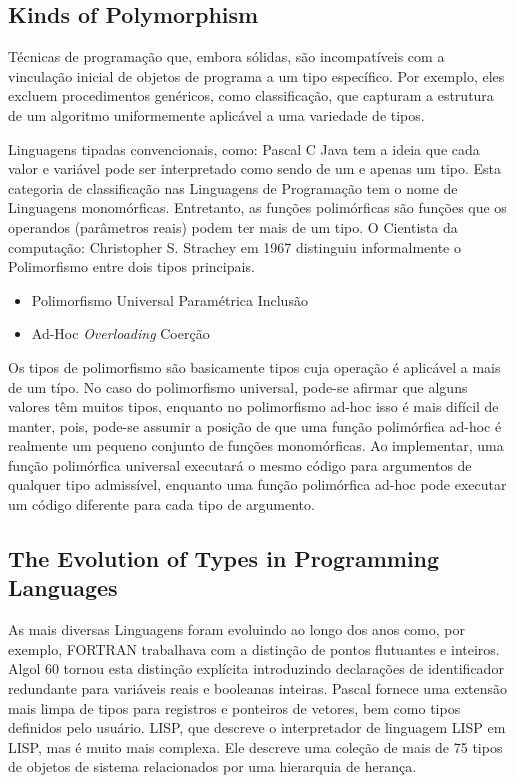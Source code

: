 \subsection{Kinds of Polymorphism}
Técnicas de programação que, embora sólidas, são incompatíveis com a vinculação inicial de objetos de programa a um tipo específico.
Por exemplo, eles excluem procedimentos genéricos, como classificação, que capturam a estrutura de um algoritmo uniformemente aplicável a uma variedade de tipos.
\par Linguagens tipadas convencionais, como: Pascal C Java tem a ideia que cada valor e variável pode ser interpretado como sendo de um e apenas um tipo.
Esta categoria de classificação nas Linguagens de Programação tem o nome de Linguagens monomórficas.
Entretanto, as funções polimórficas são funções que os operandos (parâmetros reais) podem ter mais de um tipo. O Cientista da computação: Christopher S. Strachey em 1967 distinguiu informalmente o Polimorfismo entre dois tipos principais.
\begin{itemize}
    \item Polimorfismo Universal
    \subitem Paramétrica
    \subitem Inclusão
    \item Ad-Hoc
    \subitem \textit{Overloading}
    \subitem Coerção 
\end{itemize}
\par Os tipos de polimorfismo são basicamente tipos cuja operação é aplicável a mais de um típo.
No caso do polimorfismo universal, pode-se afirmar que alguns valores têm muitos tipos, enquanto no polimorfismo ad-hoc isso é mais difícil de manter, pois, pode-se assumir a posição de que uma função polimórfica ad-hoc é realmente um pequeno conjunto de funções monomórficas.
Ao implementar, uma função polimórfica universal executará o mesmo código para argumentos de qualquer tipo admissível, enquanto uma função polimórfica ad-hoc pode executar um código diferente para cada tipo de argumento.
\subsection{The Evolution of Types in Programming Languages}
As mais diversas Linguagens foram evoluindo ao longo dos anos como, por exemplo, FORTRAN trabalhava com a distinção de pontos flutuantes e inteiros.
Algol 60 tornou esta distinção explícita introduzindo declarações de identificador redundante para variáveis reais e booleanas inteiras.
Pascal fornece uma extensão mais limpa de tipos para registros e ponteiros de vetores, bem como tipos definidos pelo usuário.
LISP, que descreve o interpretador de linguagem LISP em LISP, mas é muito mais complexa.
Ele descreve uma coleção de mais de 75 tipos de objetos de sistema relacionados por uma hierarquia de herança.

